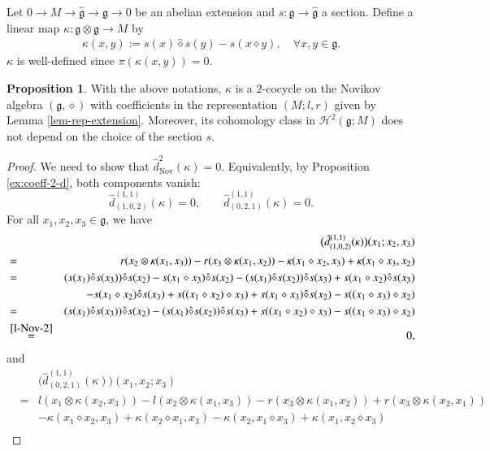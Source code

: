 \documentclass[12pt]{amsart}
\theoremstyle{definition}
\newtheorem{pro}[thm]{Proposition}
\newcommand{\g}{\mathfrak g}
\newcommand{\huaH}{\mathcal{H}}
\newcommand{\ot}{\otimes}
\begin{document}
Let $0\to M\to \hat{\g}\to \g\to0 $ be an abelian extension and $s:\g\to\hat{\g}$ a section. Define a linear map $\kappa:\g\ot\g\to M$ by
\begin{align}\label{abelian-exten-kap}
\kappa(x,y):=s(x)\hat{\diamond}s(y)-s(x\diamond y), \quad \forall x,y\in \g.
\end{align}
$\kappa$ is well-defined since $\pi(\kappa(x,y))=0$.

\begin{pro}
With the above notations, $\kappa$ is a $2$-cocycle on the Novikov algebra $(\g,\diamond)$ with coefficients in the representation $(M;l,r)$ given by Lemma \ref{lem-rep-extension}. Moreover, its cohomology class in $\huaH^2(\g;M)$ does not depend on the choice of the section $s$.
\end{pro}

\begin{proof}
We need to show that $\hat{d}_{\mathrm{Nov}}^2(\kappa)=0$. Equivalently, by Proposition \ref{ex:coeff-2-d}, both components vanish:
	\[
	\hat{d}_{(1,0,2)}^{(1,1)}(\kappa)=0,\qquad \hat{d}_{(0,2,1)}^{(1,1)}(\kappa)=0.
	\]
	For all $x_1,x_2,x_3\in\g$, we have
	\begin{eqnarray*}
		&&\bigl(\hat{d}_{(1,0,2)}^{(1,1)}(\kappa)\bigr)(x_1;x_2,x_3)\\
		&=&r(x_2\ot\kappa(x_1,x_3))-r(x_3\ot\kappa(x_1,x_2))-\kappa(x_1\diamond x_2,x_3)+\kappa(x_1\diamond x_3,x_2)\\
		&=&(s(x_1)\hat{\diamond} s(x_3))\hat{\diamond} s(x_2)-s(x_1\diamond x_3)\hat{\diamond}s(x_2)-(s(x_1)\hat{\diamond} s(x_2))\hat{\diamond} s(x_3)+s(x_1\diamond x_2)\hat{\diamond}s(x_3)\\
		&&-s(x_1\diamond x_2)\hat{\diamond} s(x_3)+s((x_1\diamond x_2)\diamond x_3)+s(x_1\diamond x_3)\hat{\diamond} s(x_2)-s((x_1\diamond x_3)\diamond x_2)\\
		&=&(s(x_1)\hat{\diamond} s(x_3))\hat{\diamond} s(x_2)-(s(x_1)\hat{\diamond} s(x_2))\hat{\diamond} s(x_3)+s((x_1\diamond x_2)\diamond x_3)-s((x_1\diamond x_3)\diamond x_2)\\
		&\overset{\eqref{l-Nov-2}}{=}&0,
	\end{eqnarray*}
	and
	\begin{eqnarray*}
		&&\big(\hat{d}_{(0,2,1)}^{(1,1)}( \kappa)\big)(x_1,x_2;x_3)\\
		&=&l(x_1\ot \kappa(x_2,x_3))-l(x_2\ot \kappa(x_1,x_3))-r(x_3\ot \kappa(x_1,x_2))+r(x_3\ot \kappa(x_2,x_1))\\
		&&- \kappa(x_1\diamond x_2,x_3)+ \kappa(x_2\diamond x_1,x_3)- \kappa(x_2,x_1\diamond x_3)+ \kappa(x_1,x_2\diamond x_3)\\

\end{eqnarray*}
\end{proof}
\end{document}
